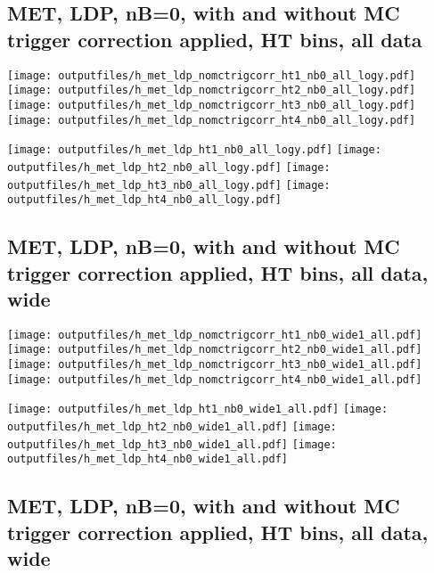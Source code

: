 \documentclass[11pt]{article}
\begin{document}
    \clearpage
     \subsection{ MET, LDP, nB=0, with and without MC trigger correction applied, HT bins, all data}

    \noindent
     \texttt{[image: outputfiles/h\_met\_ldp\_nomctrigcorr\_ht1\_nb0\_all\_logy.pdf]}
     \texttt{[image: outputfiles/h\_met\_ldp\_nomctrigcorr\_ht2\_nb0\_all\_logy.pdf]}
     \texttt{[image: outputfiles/h\_met\_ldp\_nomctrigcorr\_ht3\_nb0\_all\_logy.pdf]}
     \texttt{[image: outputfiles/h\_met\_ldp\_nomctrigcorr\_ht4\_nb0\_all\_logy.pdf]}

    \noindent
     \texttt{[image: outputfiles/h\_met\_ldp\_ht1\_nb0\_all\_logy.pdf]}
     \texttt{[image: outputfiles/h\_met\_ldp\_ht2\_nb0\_all\_logy.pdf]}
     \texttt{[image: outputfiles/h\_met\_ldp\_ht3\_nb0\_all\_logy.pdf]}
     \texttt{[image: outputfiles/h\_met\_ldp\_ht4\_nb0\_all\_logy.pdf]}

    \clearpage
     \subsection{ MET, LDP, nB=0, with and without MC trigger correction applied, HT bins, all data, wide}

    \noindent
     \texttt{[image: outputfiles/h\_met\_ldp\_nomctrigcorr\_ht1\_nb0\_wide1\_all.pdf]}
     \texttt{[image: outputfiles/h\_met\_ldp\_nomctrigcorr\_ht2\_nb0\_wide1\_all.pdf]}
     \texttt{[image: outputfiles/h\_met\_ldp\_nomctrigcorr\_ht3\_nb0\_wide1\_all.pdf]}
     \texttt{[image: outputfiles/h\_met\_ldp\_nomctrigcorr\_ht4\_nb0\_wide1\_all.pdf]}

    \noindent
     \texttt{[image: outputfiles/h\_met\_ldp\_ht1\_nb0\_wide1\_all.pdf]}
     \texttt{[image: outputfiles/h\_met\_ldp\_ht2\_nb0\_wide1\_all.pdf]}
     \texttt{[image: outputfiles/h\_met\_ldp\_ht3\_nb0\_wide1\_all.pdf]}
     \texttt{[image: outputfiles/h\_met\_ldp\_ht4\_nb0\_wide1\_all.pdf]}

    \clearpage
     \subsection{ MET, LDP, nB=0, with and without MC trigger correction applied, HT bins, all data, wide}
\end{document}
